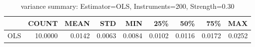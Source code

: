\begin{table}[ht]
\centering
\caption{variance summary: Estimator=OLS, Instruments=200, Strength=0.30}
\begin{tabular}{lrrrrrrrr}
\toprule
 & COUNT & MEAN & STD & MIN & 25\% & 50\% & 75\% & MAX \\
\midrule
OLS & 10.0000 & 0.0142 & 0.0063 & 0.0084 & 0.0102 & 0.0116 & 0.0172 & 0.0252 \\
\bottomrule
\end{tabular}
\end{table}
